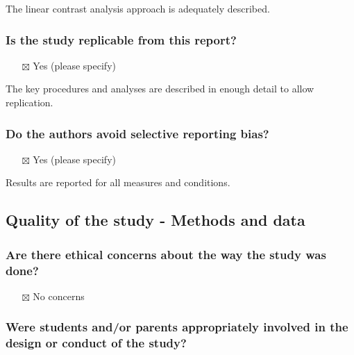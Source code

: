 \documentclass[
  doc, a4paper]{apa7}
\providecommand{\tightlist}{%
  \setlength{\itemsep}{0pt}\setlength{\parskip}{0pt}}
\begin{document}
The linear contrast analysis approach is adequately described.

\subsubsection{Is the study replicable from this report?}\label{is-the-study-replicable-from-this-report}

\begin{itemize}
\tightlist
\item[$\boxtimes$]
  Yes (please specify)
\end{itemize}

The key procedures and analyses are described in enough detail to allow replication.

\subsubsection{Do the authors avoid selective reporting bias?}\label{do-the-authors-avoid-selective-reporting-bias}

\begin{itemize}
\tightlist
\item[$\boxtimes$]
  Yes (please specify)
\end{itemize}

Results are reported for all measures and conditions.

\subsection{Quality of the study - Methods and data}\label{quality-of-the-study---methods-and-data}

\subsubsection{Are there ethical concerns about the way the study was done?}\label{are-there-ethical-concerns-about-the-way-the-study-was-done}

\begin{itemize}
\tightlist
\item[$\boxtimes$]
  No concerns
\end{itemize}

\subsubsection{Were students and/or parents appropriately involved in the design or conduct of the study?}\label{were-students-andor-parents-appropriately-involved-in-the-design-or-conduct-of-the-study}
\end{document}
